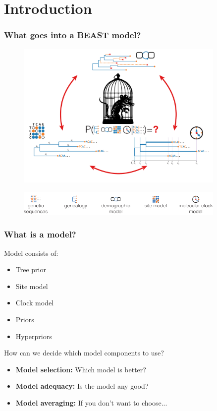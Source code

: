 \section{Introduction}

\begin{frame}\frametitle{What goes into a BEAST model?}
  \begin{figure}
      \includegraphics[width=0.9\textwidth]{figures/Taming-the-BEAST-Splash.pdf}
  \end{figure}
    \begin{figure}
      \includegraphics[width=0.9\textwidth]{figures/ModelComponents.pdf}
  \end{figure}
\end{frame}

\begin{frame}\frametitle{What is a model?}
      Model consists of:
        \begin{itemize}
            \item Tree prior
            \item Site model
            \item Clock model
            \item Priors
            \item Hyperpriors
        \end{itemize}

      \vspace{1cm}
      How can we decide which model components to use?

      \begin{itemize}
           \item \textbf{Model selection:} Which model is better?
           \item \textbf{Model adequacy:} Is the model any good?
           \item \textbf{Model averaging:} If you don't want to choose...
       \end{itemize}
      
\end{frame}

